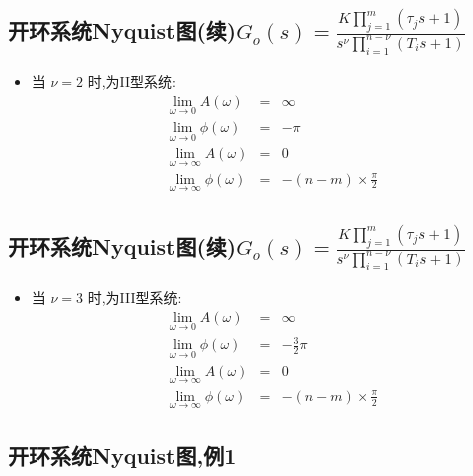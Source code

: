 \documentclass[table]{article}
\begin{document}
\subsection{开环系统Nyquist图(续)\(G_o(s) =\frac{K\prod_{j=1}^m(\tau_j s+1)}{s^{\nu}\prod_{i=1}^{n-\nu}(T_i s+1)}\)}
\label{sec:org63bfa07}
\begin{itemize}
\item 当  \(\nu=2\)  时,为II型系统:
\begin{eqnarray*}
\lim_{\omega\rightarrow 0} A(\omega) & = & \infty\\
\lim_{\omega\rightarrow 0} \phi(\omega)&=&-\pi \\
\lim_{\omega\rightarrow\infty} A(\omega)&=&0 \\
\lim_{\omega\rightarrow\infty} \phi(\omega)&=& -(n-m)\times\frac{\pi}{2} 
\end{eqnarray*}
\end{itemize}
\subsection{开环系统Nyquist图(续)\(G_o(s) =\frac{K\prod_{j=1}^m(\tau_j s+1)}{s^{\nu}\prod_{i=1}^{n-\nu}(T_i s+1)}\)}
\label{sec:org2d81142}
\begin{itemize}
\item 当  \(\nu=3\)  时,为III型系统:
\begin{eqnarray*}
\lim_{\omega\rightarrow 0} A(\omega) & = & \infty\\
\lim_{\omega\rightarrow 0} \phi(\omega)&=&-\frac{3}{2}\pi \\
\lim_{\omega\rightarrow\infty} A(\omega)&=&0 \\
\lim_{\omega\rightarrow\infty} \phi(\omega)&=& -(n-m)\times\frac{\pi}{2} 
\end{eqnarray*}
\end{itemize}

\subsection{开环系统Nyquist图,例1}
\label{sec:org34018b4}
\end{document}
